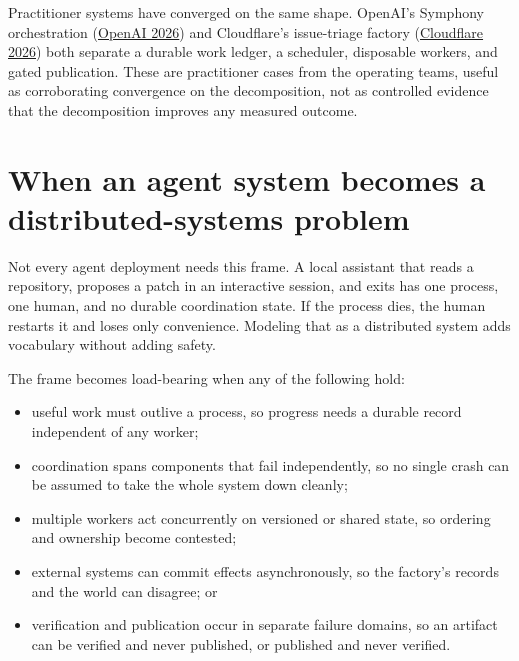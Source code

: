Practitioner systems have converged on the same shape. OpenAI's Symphony orchestration (\href{https://openai.com/index/open-source-codex-orchestration-symphony/}{OpenAI 2026}) and Cloudflare's issue-triage factory (\href{https://blog.cloudflare.com/astro-issue-triage/}{Cloudflare 2026}) both separate a durable work ledger, a scheduler, disposable workers, and gated publication. These are practitioner cases from the operating teams, useful as corroborating convergence on the decomposition, not as controlled evidence that the decomposition improves any measured outcome.

\hypertarget{when-an-agent-system-becomes-a-distributed-systems-problem}{%
\section*{When an agent system becomes a distributed-systems problem}\label{when-an-agent-system-becomes-a-distributed-systems-problem}}

Not every agent deployment needs this frame. A local assistant that reads a repository, proposes a patch in an interactive session, and exits has one process, one human, and no durable coordination state. If the process dies, the human restarts it and loses only convenience. Modeling that as a distributed system adds vocabulary without adding safety.

The frame becomes load-bearing when any of the following hold:

\begin{itemize}
\tightlist
\item
  useful work must outlive a process, so progress needs a durable record independent of any worker;
\item
  coordination spans components that fail independently, so no single crash can be assumed to take the whole system down cleanly;
\item
  multiple workers act concurrently on versioned or shared state, so ordering and ownership become contested;
\item
  external systems can commit effects asynchronously, so the factory's records and the world can disagree; or
\item
  verification and publication occur in separate failure domains, so an artifact can be verified and never published, or published and never verified.
\end{itemize}


